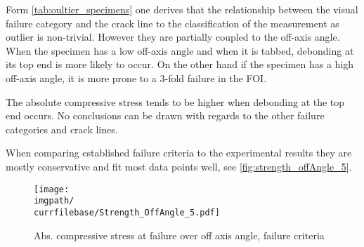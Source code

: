 Form \autoref{tab:oultier_specimens} one derives that the relationship between the visual failure category and the crack line to the classification of the measurement as outlier is non-trivial. However they are partially coupled to the off-axis angle. When the specimen has a low off-axis angle and when it is tabbed, debonding at its top end is more likely to occur. On the other hand if the specimen has a high off-axis angle, it is more prone to a 3-fold failure in the FOI.

The absolute compressive stress tends to be higher when debonding at the top end occurs. No conclusions can be drawn with regards to the other failure categories and crack lines.

When comparing established failure criteria to the experimental results they are mostly conservative and fit most data points well, see \autoref{fig:strength_offAngle_5}.
\begin{figure}[!ht]
    \centering
    \texttt{[image: \\imgpath/\\currfilebase/Strength\_OffAngle\_5.pdf]}
    \caption{Abs. compressive stress at failure over off axis angle, failure criteria}
    \label{fig:strength_offAngle_5}
\end{figure}